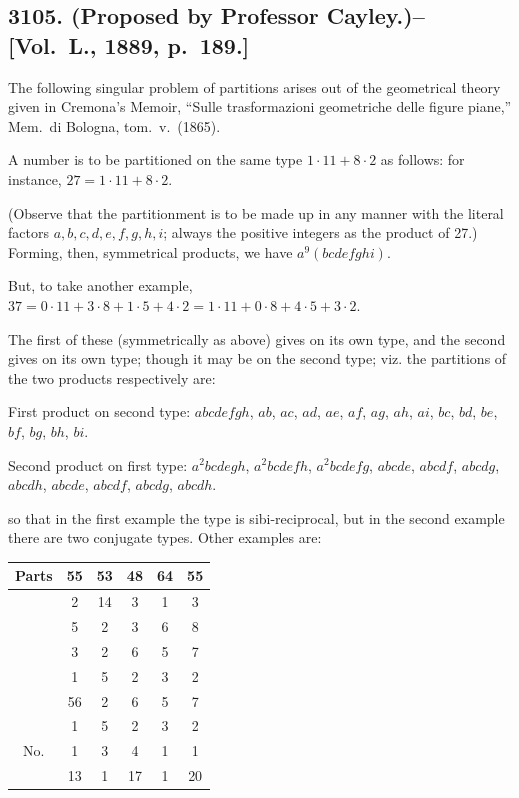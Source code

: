 \documentclass[11pt,a4paper]{book}
\begin{document}
\subsection*{3105. (Proposed by Professor Cayley.)\---[Vol.~L., 1889, p.~189.]}

The following singular problem of partitions arises out of the geometrical theory given in Cremona's Memoir, ``Sulle trasformazioni geometriche delle figure piane,'' Mem.~di Bologna, tom.~v.~(1865).

A number is to be partitioned on the same type $1\cdot11 + 8\cdot2$ as follows: for instance, $27 = 1\cdot11 + 8\cdot2$.

(Observe that the partitionment is to be made up in any manner with the literal factors $a,b,c,d,e,f,g,h,i$; always the positive integers as the product of 27.) Forming, then, symmetrical products, we have $a^9(bcdefghi)$.

But, to take another example, $37 = 0\cdot11 + 3\cdot8 + 1\cdot5 + 4\cdot2 = 1\cdot11 + 0\cdot8 + 4\cdot5 + 3\cdot2$.

The first of these (symmetrically as above) gives on its own type, and the second gives on its own type; though it may be on the second type; viz. the partitions of the two products respectively are:

First product on second type: $abcdefgh$, $ab$, $ac$, $ad$, $ae$, $af$, $ag$, $ah$, $ai$, $bc$, $bd$, $be$, $bf$, $bg$, $bh$, $bi$.

Second product on first type: $a^2bcdegh$, $a^2bcdefh$, $a^2bcdefg$, $abcde$, $abcdf$, $abcdg$, $abcdh$, $abcde$, $abcdf$, $abcdg$, $abcdh$.

so that in the first example the type is sibi-reciprocal, but in the second example there are two conjugate types. Other examples are:

\begin{center}
\begin{tabular}{c|ccccc}
Parts & 55 & 53 & 48 & 64 & 55 \\ \hline
& 2 & 14 & 3 & 1 & 3 \\
& 5 & 2 & 3 & 6 & 8 \\
& 3 & 2 & 6 & 5 & 7 \\
& 1 & 5 & 2 & 3 & 2 \\
& 56 & 2 & 6 & 5 & 7 \\
& 1 & 5 & 2 & 3 & 2 \\ \hline
No. & 1 & 3 & 4 & 1 & 1 \\
& 13 & 1 & 17 & 1 & 20
\end{tabular}
\end{center}
\end{document}
